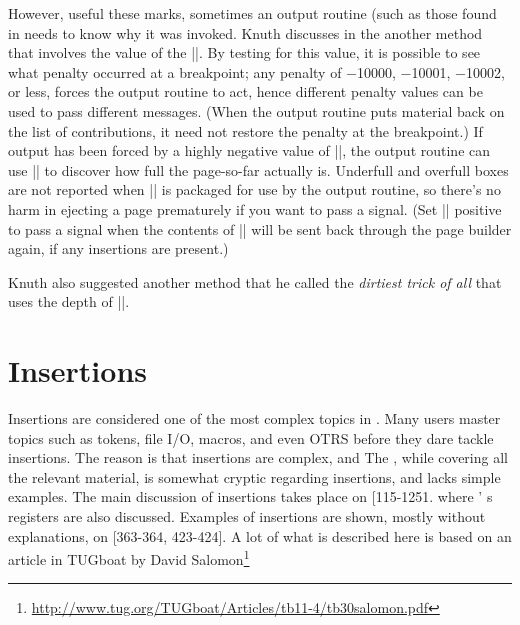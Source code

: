 \begin{teXXX}
\def\section#1{ ...
   \penalty\beforesectionpenalty
   \mark{#1}
   \hbox{ ... #1 ...}
   \nobreak
   \vskip\aftersectionskip
   \noindent}
\end{teXXX}

\newdimen\theight 
\def \TeXref#1{%
             \vadjust{\setbox0=\hbox{\sevenrm\quad\quad\TeX book: #1}%
             \theight=\ht0 
             \advance\theight by \dp0    \advance\theight by \lineskip 
             \kern -\theight \vbox to \theight{\rightline{\rlap{\box0}}%
             \vss}%
             }}%
 
However, useful these marks, sometimes an output routine (such as those found in \latexe needs to know why it was invoked. Knuth discusses in the \TeXref{396}  another method
that involves the value of the |\outputpenalty|. 
By testing for this value, it is possible to see what penalty occurred at a breakpoint;
any penalty of −10000, −10001, −10002, or less, forces the output routine to
act, hence different penalty values can be used to pass different messages. (When
the output routine puts material back on the list of contributions, it need not restore
the penalty at the breakpoint.) If output has been forced by a highly negative value
of |\outputpenalty|, the output routine can use |\vbox{}| to discover how
full the page-so-far actually is. Underfull and overfull boxes are not reported when
|| is packaged for use by the output routine, so there’s no harm in ejecting a
page prematurely if you want to pass a signal. (Set |\holdinginserts| positive to pass
a signal when the contents of || will be sent back through the page builder again,
if any insertions are present.)

Knuth also suggested another method that he called the \emph{dirtiest trick of all} that uses the depth 
of ||. 

\section{Insertions}
Insertions are considered one of  the most  complex  topics in \tex. Many users master  topics  such 
as tokens,  file  I/O, macros,  and  even  OTRS  before they dare  tackle  insertions.  The  reason  is  that 
insertions  are  complex,  and  The \texbook, while 
covering all the relevant material, is somewhat cryptic regarding  insertions, and  lacks  simple examples. 
The  main  discussion  of  insertions takes  place  on 
[115-1251.  where \tex' s  registers  are also discussed. 
Examples  of  insertions are  shown, mostly  without 
explanations,  on  [363-364,  423-424].  A lot of what is described here is based on an article in TUGboat by David Salomon\footnote{\protect\url{http://www.tug.org/TUGboat/Articles/tb11-4/tb30salomon.pdf}}

